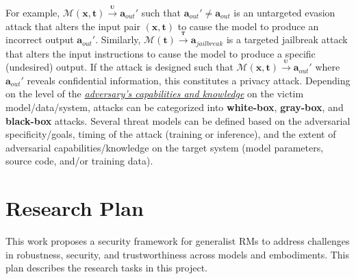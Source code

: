 \documentclass[11pt,letterpaper]{article}
\begin{document}
For example, $\mathcal{M}(\bm{x},\bm{t}) \xrightarrow{{}_{\textbf{U}}} \bm{a}_{out}'$ such that $\bm{a}_{out}' \neq \bm{a}_{out}$ is an untargeted evasion attack that alters the input pair $(\bm{x},\bm{t})$ to cause the model to produce an incorrect output $\bm{a}_{out}'$.
Similarly, $\mathcal{M}(\bm{t}) \xrightarrow{{}_{\textbf{T}}} \bm{a}_{jailbreak}$ is a targeted jailbreak attack that alters the input instructions to cause the model to produce a specific (undesired) output.
If the attack is designed such that $\mathcal{M}(\bm{x},\bm{t}) \xrightarrow{{}_{\textbf{U}}} \bm{a}_{out}'$ where $\bm{a}_{out}'$ reveals confidential information, this constitutes a privacy attack.
Depending on the level of the \ul{\emph{adversary's capabilities and knowledge}} on the victim model/data/system, attacks can be categorized into \textbf{white-box}, \textbf{gray-box}, and \textbf{black-box} attacks. 
Several threat models can be defined based on the adversarial specificity/goals, timing of the attack (\eg training or inference), and the extent of adversarial capabilities/knowledge on the target system (\eg model parameters, source code, and/or training data).






\section{Research Plan} \label{sec:research_plan}

This work proposes a security framework for generalist RMs to address challenges in robustness, security, and trustworthiness across models and embodiments. This plan describes the research tasks in this project.
\end{document}
